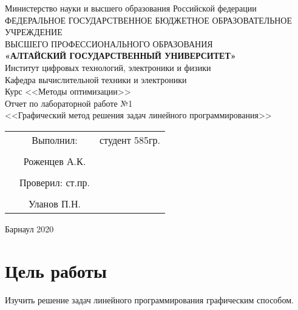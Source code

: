 \documentclass[14pt]{extarticle}
\begin{document}
\begin{center}
\hfill \break
\large{Министерство науки и высшего образования Российской федерации}\\
\footnotesize{ФЕДЕРАЛЬНОЕ ГОСУДАРСТВЕННОЕ БЮДЖЕТНОЕ ОБРАЗОВАТЕЛЬНОЕ УЧРЕЖДЕНИЕ}\\
\footnotesize{ВЫСШЕГО ПРОФЕССИОНАЛЬНОГО ОБРАЗОВАНИЯ}\\
\small{\textbf{«АЛТАЙСКИЙ ГОСУДАРСТВЕННЫЙ УНИВЕРСИТЕТ»}}\\
\hfill \break
\normalsize{Институт цифровых технологий, электроники и физики}\\
 \hfill \break
\normalsize{Кафедра вычислительной техники и электроники}\\
\hfill\break
\hfill \break
\hfill \break
\hfill \break
\large{Курс <<Методы оптимизации>>\\ Отчет по лабораторной работе №1\\ <<Графический метод решения задач линейного программирования>>}\\
\end{center}
\hfill \break
\hfill \break
\hfill \break
\hfill \break
\hfill \break

\normalsize{
  \begin{flushright}
    \begin{tabular}{rcr}
      & Выполнил: & студент 585гр.\\\\
      & Роженцев А.К. &\underline{\hspace{3cm}}\\\\
      & Проверил: ст.пр.\\\\
      & Уланов П.Н. & \underline{\hspace{3cm}}
    \end{tabular}
  \end{flushright}
}
\hfill \break
\hfill \break
\hfill \break
\hfill \break
\hfill \break
\begin{center} Барнаул 2020 \end{center}
\thispagestyle{empty}
\newpage
\tableofcontents
\newpage
\section{Цель работы}
Изучить решение задач линейного программирования графическим способом.
\end{document}
